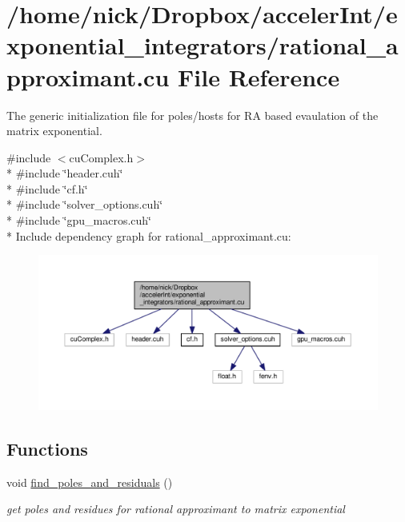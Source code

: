 \hypertarget{rational__approximant_8cu}{}\section{/home/nick/\+Dropbox/acceler\+Int/exponential\+\_\+integrators/rational\+\_\+approximant.cu File Reference}
\label{rational__approximant_8cu}


The generic initialization file for poles/hosts for RA based evaulation of the matrix exponential.  


{\ttfamily \#include $<$cu\+Complex.\+h$>$}\\*
{\ttfamily \#include \char`\"{}header.\+cuh\char`\"{}}\\*
{\ttfamily \#include \char`\"{}cf.\+h\char`\"{}}\\*
{\ttfamily \#include \char`\"{}solver\+\_\+options.\+cuh\char`\"{}}\\*
{\ttfamily \#include \char`\"{}gpu\+\_\+macros.\+cuh\char`\"{}}\\*
Include dependency graph for rational\+\_\+approximant.\+cu\+:
\nopagebreak
\begin{figure}[H]
\begin{center}
\leavevmode
\includegraphics[width=350pt]{rational__approximant_8cu__incl}
\end{center}
\end{figure}
\subsection*{Functions}
\begin{DoxyCompactItemize}
\item 
void \hyperlink{rational__approximant_8cu_a1cb9bed79a1ce457c891851da0cec0ba}{find\+\_\+poles\+\_\+and\+\_\+residuals} ()
\begin{DoxyCompactList}\small\item\em get poles and residues for rational approximant to matrix exponential \end{DoxyCompactList}\end{DoxyCompactItemize}
